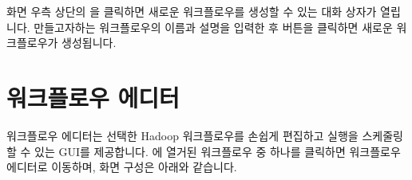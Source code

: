 \documentclass[letterpaper,10pt,english]{sphinxmanual}
\begin{document}
화면 우측 상단의 을 클릭하면 새로운 워크플로우를 생성할 수 있는 대화 상자가 열립니다. 만들고자하는 워크플로우의 이름과 설명을 입력한 후  버튼을 클릭하면 새로운 워크플로우가 생성됩니다.
\begin{quote}

\begin{figure}[H]
\centering

\noindent{}
\end{figure}
\end{quote}


\chapter{워크플로우 에디터}
\label{\detokenize{integrator/part03/index:workflow-editor}}\label{\detokenize{integrator/part03/index:id1}}\label{\detokenize{integrator/part03/index::doc}}
워크플로우 에디터는 선택한 Hadoop 워크플로우를 손쉽게 편집하고 실행을 스케줄링할 수 있는 GUI를 제공합니다. {\hyperref[\detokenize{integrator/part02/index:workflow-list}]{}}에 열거된 워크플로우 중 하나를 클릭하면 워크플로우 에디터로 이동하며, 화면 구성은 아래와 같습니다.
\end{document}
